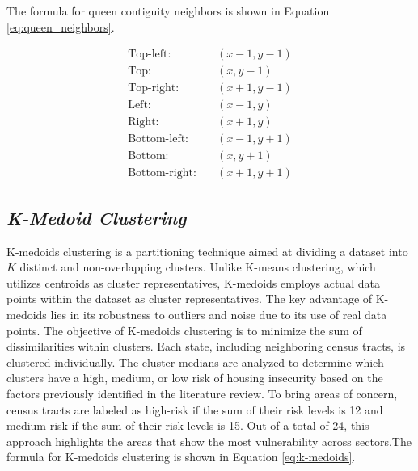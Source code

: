 The formula for queen contiguity neighbors is shown in Equation \ref{eq:queen_neighbors}.

\begin{equation}
    \label{eq:queen_neighbors}
    \begin{aligned}
        \text{Top-left:} & \quad (x-1, y-1) \\
        \text{Top:} & \quad (x, y-1) \\
        \text{Top-right:} & \quad (x+1, y-1) \\
        \text{Left:} & \quad (x-1, y) \\
        \text{Right:} & \quad (x+1, y) \\
        \text{Bottom-left:} & \quad (x-1, y+1) \\
        \text{Bottom:} & \quad (x, y+1) \\
        \text{Bottom-right:} & \quad (x+1, y+1)
    \end{aligned}
\end{equation}

\subsection{\textit{K-Medoid Clustering}}
K-medoids clustering is a partitioning technique aimed at dividing a dataset into \(K\) distinct and non-overlapping clusters. Unlike K-means clustering, which utilizes centroids as cluster representatives, K-medoids employs actual data points within the dataset as cluster representatives. The key advantage of K-medoids lies in its robustness to outliers and noise due to its use of real data points. The objective of K-medoids clustering is to minimize the sum of dissimilarities within clusters. Each state, including neighboring census tracts, is clustered individually. The cluster medians are analyzed to determine which clusters have a high, medium, or low risk of housing insecurity based on the factors previously identified in the literature review. To bring areas of concern, census tracts are labeled as high-risk if the sum of their risk levels is 12 and medium-risk if the sum of their risk levels is 15. Out of a total of 24, this approach highlights the areas that show the most vulnerability across sectors.The formula for K-medoids clustering is shown in Equation \ref{eq:k-medoids}.

